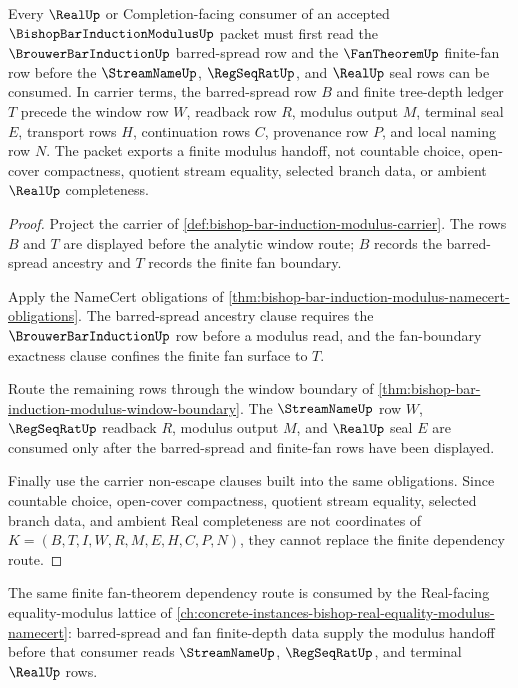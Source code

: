 \begin{theorem}
\label{thm:bishop-bar-induction-modulus-fan-theorem-dependency}
Every $\RealUp$ or Completion-facing consumer of an accepted $\BishopBarInductionModulusUp$ packet must first read the $\BrouwerBarInductionUp$ barred-spread row and the $\FanTheoremUp$ finite-fan row before the $\StreamNameUp$, $\RegSeqRatUp$, and $\RealUp$ seal rows can be consumed. In carrier terms, the barred-spread row $B$ and finite tree-depth ledger $T$ precede the window row $W$, readback row $R$, modulus output $M$, terminal seal $E$, transport rows $H$, continuation rows $C$, provenance row $P$, and local naming row $N$. The packet exports a finite modulus handoff, not countable choice, open-cover compactness, quotient stream equality, selected branch data, or ambient $\RealUp$ completeness.
\end{theorem}
\begin{proof}
Project the carrier of \autoref{def:bishop-bar-induction-modulus-carrier}. The rows $B$ and $T$ are displayed before the analytic window route; $B$ records the barred-spread ancestry and $T$ records the finite fan boundary.

Apply the NameCert obligations of \autoref{thm:bishop-bar-induction-modulus-namecert-obligations}. The barred-spread ancestry clause requires the $\BrouwerBarInductionUp$ row before a modulus read, and the fan-boundary exactness clause confines the finite fan surface to $T$.

Route the remaining rows through the window boundary of \autoref{thm:bishop-bar-induction-modulus-window-boundary}. The $\StreamNameUp$ row $W$, $\RegSeqRatUp$ readback $R$, modulus output $M$, and $\RealUp$ seal $E$ are consumed only after the barred-spread and finite-fan rows have been displayed.

Finally use the carrier non-escape clauses built into the same obligations. Since countable choice, open-cover compactness, quotient stream equality, selected branch data, and ambient Real completeness are not coordinates of $K=(B,T,I,W,R,M,E,H,C,P,N)$, they cannot replace the finite dependency route.
\end{proof}

The same finite fan-theorem dependency route is consumed by the Real-facing equality-modulus lattice of \autoref{ch:concrete-instances-bishop-real-equality-modulus-namecert}: barred-spread and fan finite-depth data supply the modulus handoff before that consumer reads $\StreamNameUp$, $\RegSeqRatUp$, and terminal $\RealUp$ rows.

